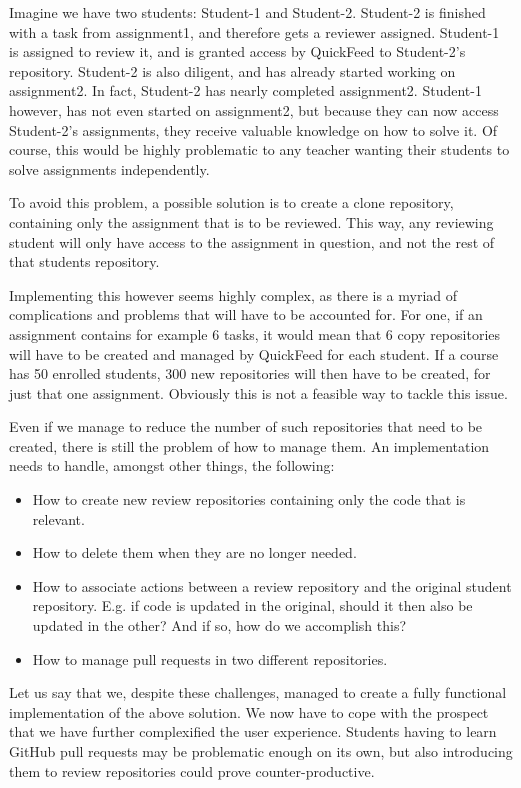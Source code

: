 Imagine we have two students: Student-1 and Student-2.
Student-2 is finished with a task from assignment1, and therefore gets a reviewer assigned.
Student-1 is assigned to review it, and is granted access by QuickFeed to Student-2's repository.
Student-2 is also diligent, and has already started working on assignment2.
In fact, Student-2 has nearly completed assignment2.
Student-1 however, has not even started on assignment2, but because they can now access Student-2's assignments, they receive valuable knowledge on how to solve it.
Of course, this would be highly problematic to any teacher wanting their students to solve assignments independently.

To avoid this problem, a possible solution is to create a clone repository, containing only the assignment that is to be reviewed. 
This way, any reviewing student will only have access to the assignment in question, and not the rest of that students repository.

Implementing this however seems highly complex, as there is a myriad of complications and problems that will have to be accounted for.
For one, if an assignment contains for example 6 tasks, it would mean that 6 copy repositories will have to be created and managed by QuickFeed for each student.
If a course has 50 enrolled students, 300 new repositories will then have to be created, for just that one assignment.
Obviously this is not a feasible way to tackle this issue.

Even if we manage to reduce the number of such repositories that need to be created, there is still the problem of how to manage them.
An implementation needs to handle, amongst other things, the following:

\begin{itemize}
    \item How to create new review repositories containing only the code that is relevant.
    \item How to delete them when they are no longer needed.
    \item How to associate actions between a review repository and the original student repository.
          E.g. if code is updated in the original, should it then also be updated in the other?
          And if so, how do we accomplish this?
    \item How to manage pull requests in two different repositories.
\end{itemize}

Let us say that we, despite these challenges, managed to create a fully functional implementation of the above solution.
We now have to cope with the prospect that we have further complexified the user experience.
Students having to learn GitHub pull requests may be problematic enough on its own, but also introducing them to review repositories could prove counter-productive.

